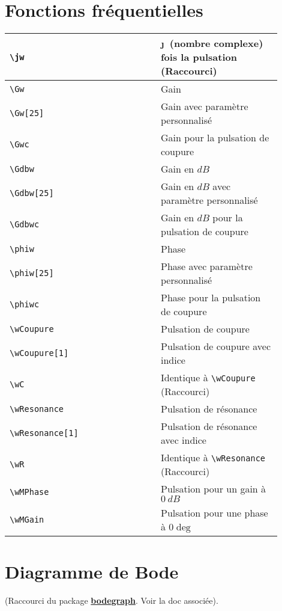 \documentclass[a4paper,12pt]{article}
\newcommand{\rac}{({\color{red}Raccourci})}
\begin{document}
	
	
	\section{Fonctions fréquentielles}
	\begin{tabular}{|p{0.35\linewidth}|p{0.15\linewidth}|p{0.4\linewidth}|}
		\hline
			\verb!\jw!	&	\jw &	\j\ (nombre complexe) fois la pulsation \rac
		\\\hline
			\verb!\Gw!	&	\Gw &	Gain
		\\\hline
			\verb!\Gw[25]!	&	\Gw[25] &	Gain avec paramètre personnalisé
		\\\hline
			\verb!\Gwc!	&	\Gwc &	Gain pour la pulsation de coupure
		\\\hline
			\verb!\Gdbw!	&	\Gdbw &	Gain en $dB$
		\\\hline
			\verb!\Gdbw[25]!&	\Gdbw[25] &	Gain en $dB$ avec paramètre personnalisé
		\\\hline
			\verb!\Gdbwc!	&	\Gdbwc &	Gain en $dB$ pour la pulsation de coupure
		\\\hline
			\verb!\phiw!	&	\phiw &	Phase
		\\\hline
			\verb!\phiw[25]!	&	\phiw[25] &	Phase avec paramètre personnalisé
		\\\hline
			\verb!\phiwc!	&	\phiwc &	Phase pour la pulsation de coupure
		\\\hline
			\verb!\wCoupure!	&	\wCoupure &	Pulsation de coupure
		\\\hline
			\verb!\wCoupure[1]!	&	\wCoupure[1] &	Pulsation de coupure avec indice
		\\\hline
			\verb!\wC!	&	\wC &	Identique à \verb!\wCoupure! \rac
		\\\hline
			\verb!\wResonance!	&	\wResonance &	Pulsation de résonance
		\\\hline
			\verb!\wResonance[1]!	&	\wResonance[1] &	Pulsation de résonance avec indice
		\\\hline
			\verb!\wR!	&	\wR &	Identique à \verb!\wResonance! \rac
		\\\hline
			\verb!\wMPhase!	&	\wMPhase &	Pulsation pour un gain à $0\ dB$
		\\\hline
			\verb!\wMGain!	&	\wMGain &	Pulsation pour une phase à $0\deg$
		\\\hline
	\end{tabular}

	
	\section{Diagramme de Bode}
	(Raccourci du package \href{http://sciences-indus-cpge.papanicola.info/Bode-Black-et-Nyquist-avec-Tikz}{\textbf{bodegraph}}. Voir la doc associée).
\end{document}

